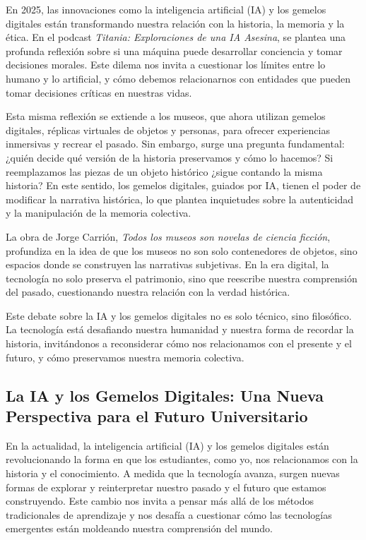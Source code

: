\documentclass[
  spanish,
  11pt,
  a4paper,
]{scrbook}
\begin{document}

En 2025, las innovaciones como la inteligencia artificial (IA) y los
gemelos digitales están transformando nuestra relación con la historia,
la memoria y la ética. En el podcast \emph{Titania: Exploraciones de una
IA Asesina}, se plantea una profunda reflexión sobre si una máquina
puede desarrollar conciencia y tomar decisiones morales. Este dilema nos
invita a cuestionar los límites entre lo humano y lo artificial, y cómo
debemos relacionarnos con entidades que pueden tomar decisiones críticas
en nuestras vidas.

Esta misma reflexión se extiende a los museos, que ahora utilizan
gemelos digitales, réplicas virtuales de objetos y personas, para
ofrecer experiencias inmersivas y recrear el pasado. Sin embargo, surge
una pregunta fundamental: ¿quién decide qué versión de la historia
preservamos y cómo lo hacemos? Si reemplazamos las piezas de un objeto
histórico ¿sigue contando la misma historia? En este sentido, los
gemelos digitales, guiados por IA, tienen el poder de modificar la
narrativa histórica, lo que plantea inquietudes sobre la autenticidad y
la manipulación de la memoria colectiva.

La obra de Jorge Carrión, \emph{Todos los museos son novelas de ciencia
ficción}, profundiza en la idea de que los museos no son solo
contenedores de objetos, sino espacios donde se construyen las
narrativas subjetivas. En la era digital, la tecnología no solo preserva
el patrimonio, sino que reescribe nuestra comprensión del pasado,
cuestionando nuestra relación con la verdad histórica.

Este debate sobre la IA y los gemelos digitales no es solo técnico, sino
filosófico. La tecnología está desafiando nuestra humanidad y nuestra
forma de recordar la historia, invitándonos a reconsiderar cómo nos
relacionamos con el presente y el futuro, y cómo preservamos nuestra
memoria colectiva.

\subsection*{La IA y los Gemelos Digitales: Una Nueva Perspectiva para
el Futuro
Universitario}\label{la-ia-y-los-gemelos-digitales-una-nueva-perspectiva-para-el-futuro-universitario}

En la actualidad, la inteligencia artificial (IA) y los gemelos
digitales están revolucionando la forma en que los estudiantes, como yo,
nos relacionamos con la historia y el conocimiento. A medida que la
tecnología avanza, surgen nuevas formas de explorar y reinterpretar
nuestro pasado y el futuro que estamos construyendo. Este cambio nos
invita a pensar más allá de los métodos tradicionales de aprendizaje y
nos desafía a cuestionar cómo las tecnologías emergentes están moldeando
nuestra comprensión del mundo.
\end{document}

